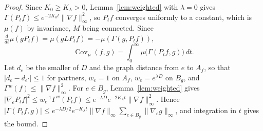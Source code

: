 \documentclass[11pt]{amsart}
\theoremstyle{definition}
\theoremstyle{remark}
\numberwithin{equation}{section}
\newcommand{\Cov}{\operatorname{Cov}}
\begin{document}
\begin{proof}
Since $K_0\ge K_\lambda>0$, Lemma~\ref{lem:weighted} with $\lambda=0$ gives
$\Gamma(P_tf)\le e^{-2K_0t}\|\nabla f\|_\infty^2$, so $P_tf$ converges uniformly
to a constant, which is $\mu(f)$ by invariance, $M$ being connected. Since
$\frac d{dt}\mu(gP_tf)=\mu(gLP_tf)=-\mu(\Gamma(g,P_tf))$,
\[
\Cov_\mu(f,g)=\int_0^\infty\mu\bigl(\Gamma(P_tf,g)\bigr)\,dt .
\]
Let $d_e$ be the smaller of $D$ and the graph distance from $e$ to $A_f$, so
that $|d_e-d_{e'}|\le1$ for partners, $w_e=1$ on $A_f$, $w_e=e^{\lambda D}$ on
$B_g$, and
$\Gamma^w(f)\le\|\nabla f\|_\infty^2$. For $e\in B_g$, Lemma~\ref{lem:weighted}
gives $|\nabla_eP_tf|^2\le w_e^{-1}\Gamma^w(P_tf)\le e^{-\lambda D}e^{-2K_\lambda t}
\|\nabla f\|_\infty^2$. Hence $|\Gamma(P_tf,g)|\le e^{-\lambda D/2}e^{-K_\lambda t}
\|\nabla f\|_\infty\sum_{e\in B_g}\|\nabla_eg\|_\infty$, and integration in $t$
gives the bound.
\end{proof}
\end{document}
